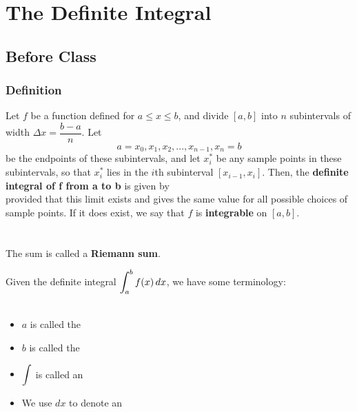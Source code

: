 \documentclass[notes]{subfiles}
\begin{document}
	\fancyhead[LO,RE]{\bfseries \small \currentname}
	\fancyfoot[C]{{}}
	\fancyfoot[LO,RE]{\large \thepage}	%
	
\section*{The Definite Integral}\label{cs52}
	\subsection*{Before Class}
	\subsubsection*{Definition}
		\begin{defn}
			Let \(f\) be a function defined for \(a\leq x\leq b\), and divide \([a,b]\) into \(n\) subintervals of width \(\Delta x = \dfrac{b-a}{n}\).  Let 
				\[a=x_0,x_1,x_2,...,x_{n-1},x_n=b\]
			be the endpoints of these subintervals, and let \(x_i^*\) be any sample points in these subintervals, so that \(x_i^*\) lies in the \(i\)th subinterval \([x_{i-1},x_i]\).  Then, the \textbf{definite integral of f from a to b} is given by
					\vspace{.75in}\\
				
			provided that this limit exists and gives the same value for all possible choices of sample points.  If it does exist, we say that \(f\) is \textbf{integrable} on \([a,b]\).\\ \\ \\
			
			The sum 	 is called a \textbf{Riemann sum}.  		
		\end{defn}
		
		\begin{rmk}[Terminology]
			Given the definite integral \(\displaystyle \int_a^b f(x)\, dx\), we have some terminology:\\ \\
				\begin{itemize}
				\setlength\itemsep{30pt}
					\item $a$ is called the 
					\item $b$ is called the 
					\item $\displaystyle \int$ is called an 
					\item We use $dx$ to denote an 
				\end{itemize}
		\end{rmk}
			\newpage
			
\end{document}
